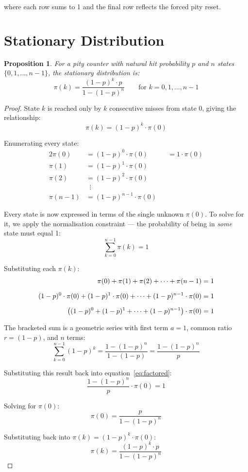 \documentclass[11pt,a4paper]{article}
\newtheorem{proposition}{Proposition}
\begin{document}
where each row sums to 1 and the final row reflects the forced pity reset.

\section{Stationary Distribution}

\begin{proposition}
For a pity counter with natural hit probability $p$ and $n$ states $\{0, 1, \ldots, n-1\}$, the stationary distribution is:
\[
\pi(k) = \frac{(1-p)^k \cdot p}{1 - (1-p)^n} \qquad \text{for } k = 0, 1, \ldots, n-1
\]
\end{proposition}

\begin{proof}
State $k$ is reached only by $k$ consecutive misses from state 0, giving the relationship:
\[
\pi(k) = (1-p)^k \cdot \pi(0)
\]

Enumerating every state:
\begin{alignat*}{2}
\pi(0)   &= (1-p)^0 \cdot \pi(0)   &&= 1 \cdot \pi(0) \\
\pi(1)   &= (1-p)^1 \cdot \pi(0)   && \\
\pi(2)   &= (1-p)^2 \cdot \pi(0)   && \\
         &\;\;\vdots                 && \\
\pi(n-1) &= (1-p)^{n-1} \cdot \pi(0) &&
\end{alignat*}

Every state is now expressed in terms of the single unknown $\pi(0)$. To solve for it, we apply the normalisation constraint --- the probability of being in \emph{some} state must equal 1:
\[
\sum_{k=0}^{n-1} \pi(k) = 1
\]

Substituting each $\pi(k)$:
\begin{align}
\pi(0) + \pi(1) + \pi(2) + \cdots + \pi(n-1) &= 1 \notag \\[6pt]
(1-p)^0 \cdot \pi(0) + (1-p)^1 \cdot \pi(0) + \cdots + (1-p)^{n-1} \cdot \pi(0) &= 1 \notag \\[6pt]
\bigl((1-p)^0 + (1-p)^1 + \cdots + (1-p)^{n-1}\bigr) \cdot \pi(0) &= 1 \label{eq:factored}
\end{align}

The bracketed sum is a geometric series with first term $a = 1$, common ratio $r = (1-p)$, and $n$ terms:
\[
\sum_{k=0}^{n-1} (1-p)^k = \frac{1 - (1-p)^n}{1 - (1-p)} = \frac{1 - (1-p)^n}{p}
\]

Substituting this result back into equation~\eqref{eq:factored}:
\[
\frac{1 - (1-p)^n}{p} \cdot \pi(0) = 1
\]

Solving for $\pi(0)$:
\[
\pi(0) = \frac{p}{1 - (1-p)^n}
\]

Substituting back into $\pi(k) = (1-p)^k \cdot \pi(0)$:
\[
\pi(k) = \frac{(1-p)^k \cdot p}{1 - (1-p)^n}
\]
\end{proof}
\end{document}
